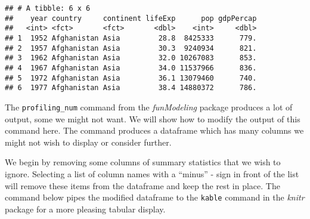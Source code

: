 \documentclass[]{book}
\newenvironment{Shaded}{\begin{snugshade}}{\end{snugshade}}
\newcommand{\KeywordTok}[1]{\textcolor[rgb]{0.13,0.29,0.53}{\textbf{#1}}}
\newcommand{\StringTok}[1]{\textcolor[rgb]{0.31,0.60,0.02}{#1}}
\newcommand{\CommentTok}[1]{\textcolor[rgb]{0.56,0.35,0.01}{\textit{#1}}}
\newcommand{\OperatorTok}[1]{\textcolor[rgb]{0.81,0.36,0.00}{\textbf{#1}}}
\newcommand{\NormalTok}[1]{#1}
\begin{document}
\begin{Shaded}
\end{Shaded}

\begin{verbatim}
## # A tibble: 6 x 6
##    year country     continent lifeExp      pop gdpPercap
##   <int> <fct>       <fct>       <dbl>    <int>     <dbl>
## 1  1952 Afghanistan Asia         28.8  8425333      779.
## 2  1957 Afghanistan Asia         30.3  9240934      821.
## 3  1962 Afghanistan Asia         32.0 10267083      853.
## 4  1967 Afghanistan Asia         34.0 11537966      836.
## 5  1972 Afghanistan Asia         36.1 13079460      740.
## 6  1977 Afghanistan Asia         38.4 14880372      786.
\end{verbatim}

The \texttt{profiling\_num} command from the \emph{funModeling} package
produces a lot of output, some we might not want. We will show how to
modify the output of this command here. The command produces a dataframe
which has many columns we might not wish to display or consider further.

We begin by removing some columns of summary statistics that we wish to
ignore. Selecting a list of column names with a ``minus'' - sign in
front of the list will remove these items from the dataframe and keep
the rest in place. The command below pipes the modified dataframe to the
\texttt{kable} command in the \emph{knitr} package for a more pleasing
tabular display.

\begin{Shaded}
\end{Shaded}
\end{document}

